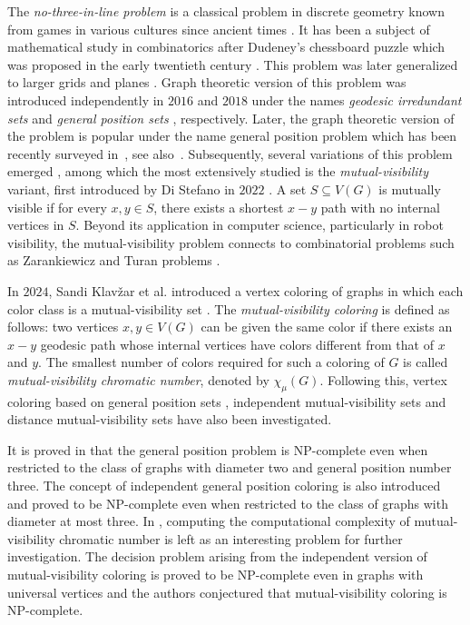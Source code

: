 \documentclass[12pt]{article}
\begin{document}
The \emph{no-three-in-line problem} is a classical problem in discrete geometry known from games in various cultures since ancient times \cite{ANC2,ANC1}. It has been a subject of mathematical study in combinatorics after Dudeney's chessboard puzzle which was proposed in the early twentieth century \cite{DDC}. This problem was later generalized to larger grids and planes \cite{ENT3, ENT, ENT4, ENT2}. Graph theoretic version of this problem was introduced independently in $2016$ and $2018$ under the names \emph{geodesic irredundant sets} \cite{GPS1} and \emph{general position sets} \cite{GPS2}, respectively. Later, the graph theoretic version of the problem is popular under the name general position problem which has been recently surveyed in~\cite{survey}, see also~\cite{Araujo-2025, Klavzar-2025b, KorzeVesel-2025, Roy-2025}. Subsequently, several variations of this problem emerged \cite{Roy-2026}, among which the most extensively studied is the \emph{mutual-visibility}  variant, first introduced by Di Stefano in $2022$ \cite{MVN1}. A set $S \subseteq V(G)$ is mutually visible if for every $x,y \in S$, there exists a shortest $x-y$ path with no internal vertices in $S$. Beyond its application in computer science, particularly in robot visibility, the mutual-visibility problem connects to combinatorial problems such as Zarankiewicz and Turan problems \cite{MVN2,MVN4,MVN3}.\par
In $2024$, Sandi Klav\v zar et al. introduced a vertex coloring of graphs in which each color class is a mutual-visibility set \cite{MVC1}. The \emph{mutual-visibility coloring}  is defined as follows: two vertices $x,y \in V (G)$ can be given the same color if there exists an $x-y$ geodesic path whose internal vertices have colors different from that of $x$ and $y$. The smallest number of colors required for such a coloring of $G$ is called \emph{mutual-visibility chromatic number}, denoted by $\chi_{\mu}(G)$. Following this, vertex coloring based on general position sets \cite{MVC3}, independent mutual-visibility sets \cite{MVC2} and  distance mutual-visibility sets \cite{Babu-2026} have also been investigated.\par
It is proved in \cite{MVC3} that the general position problem is NP-complete even when restricted to the class of graphs with diameter two and general position number three. The concept of independent general position coloring is also introduced and proved to be NP-complete even when restricted to the class of graphs with diameter at most three. In \cite{MVC1}, computing the computational complexity of mutual-visibility chromatic number is left as an interesting problem for further investigation. The decision problem arising from the independent version of mutual-visibility coloring \cite{MVC2} is proved to be NP-complete even in graphs with universal vertices and the authors conjectured that mutual-visibility coloring is NP-complete.\par
\end{document}
